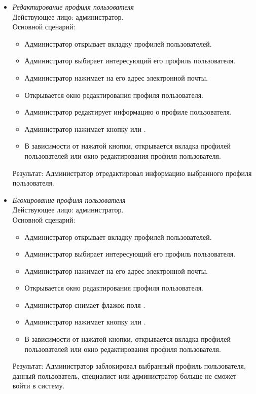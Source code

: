 \begin{itemize}[topsep=0pt, parsep=0pt, itemsep=0pt, leftmargin=*, labelindent=0.5cm]
	\item \textit{Редактирование профиля пользователя} \\
	Действующее лицо: администратор. \\
	Основной сценарий:
	\begin{itemize}[topsep=0pt, parsep=0pt, itemsep=0pt, leftmargin=*, labelindent=0.5cm]
		\item Администратор открывает вкладку профилей пользователей.
		\item Администратор выбирает интересующий его профиль пользователя.
		\item Администратор нажимает на его адрес электронной почты.
		\item Открывается окно редактирования профиля пользователя.
		\item Администратор редактирует информацию о профиле пользователя.
		\item Администратор нажимает кнопку  или .
		\item В зависимости от нажатой кнопки, открывается вкладка профилей пользователей или окно редактирования профиля пользователя.
	\end{itemize}
	Результат: Администратор отредактировал информацию выбранного профиля пользователя.
\end{itemize}

\begin{itemize}[topsep=0pt, parsep=0pt, itemsep=0pt, leftmargin=*, labelindent=0.5cm]
	\item \textit{Блокирование профиля пользователя} \\
	Действующее лицо: администратор. \\
	Основной сценарий:
	\begin{itemize}[topsep=0pt, parsep=0pt, itemsep=0pt, leftmargin=*, labelindent=0.5cm]
		\item Администратор открывает вкладку профилей пользователей.
		\item Администратор выбирает интересующий его профиль пользователя.
		\item Администратор нажимает на его адрес электронной почты.
		\item Открывается окно редактирования профиля пользователя.
		\item Администратор снимает флажок поля .
		\item Администратор нажимает кнопку  или .
		\item В зависимости от нажатой кнопки, открывается вкладка профилей пользователей или окно редактирования профиля пользователя.
	\end{itemize}
	Результат: Администратор заблокировал выбранный профиль пользователя, данный пользователь, специалист или администратор больше не сможет войти в систему.
\end{itemize}

